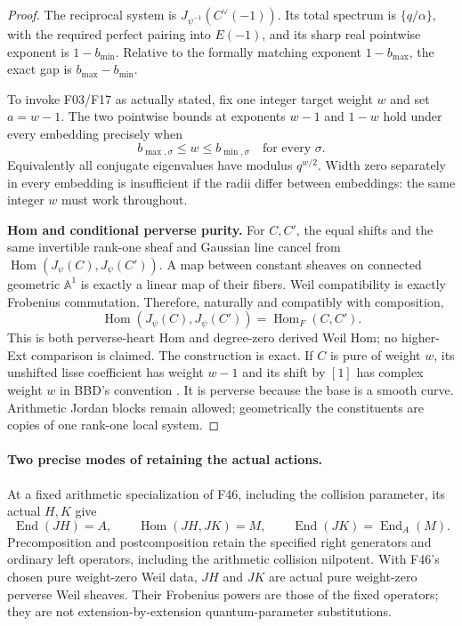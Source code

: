 \documentclass[11pt,a4paper]{article}
\newcommand{\A}{\mathbb A}\newcommand{\PP}{\mathbb P}\newcommand{\GL}{\mathrm{GL}}
\newcommand{\Hom}{\operatorname{Hom}}\newcommand{\Spec}{\operatorname{Spec}}\newcommand{\Tr}{\operatorname{Tr}}\newcommand{\rank}{\operatorname{rank}}\newcommand{\Sym}{\operatorname{Sym}}\newcommand{\Res}{\operatorname{Res}}\newcommand{\IC}{\operatorname{IC}}\newcommand{\Gr}{\operatorname{Gr}}\newcommand{\Rep}{\operatorname{Rep}}\newcommand{\Frob}{\operatorname{Frob}}\newcommand{\End}{\operatorname{End}}
\newcommand{\fid}[1]{\textsf{#1}}\newcommand{\gate}[1]{\textsf{#1}}
\theoremstyle{named}\newtheorem{finding}{Finding}[section]
\theoremstyle{definition}\newtheorem{definition}[finding]{Definition}
\theoremstyle{remark}\newtheorem{remark}[finding]{Remark}
\begin{document}
\begin{proof}
The reciprocal system is
$J_{\psi^{-1}}(C^\vee(-1))$. Its total spectrum is
$\{q/\alpha\}$, with the required perfect pairing into
$E(-1)$, and its sharp real pointwise exponent is
$1-b_{\min}$. Relative to the formally matching exponent
$1-b_{\max}$, the exact gap is $b_{\max}-b_{\min}$.

To invoke \fid{F03}/\fid{F17} as actually stated, fix one
integer target weight $w$ and set $a=w-1$.
The two pointwise bounds at exponents $w-1$ and $1-w$
hold under every embedding precisely when
\begin{equation}\label{eq:gausscommonweight}
 b_{\max,\sigma}\le w\le b_{\min,\sigma}
                    \quad\text{for every }\sigma.
\end{equation}
Equivalently all conjugate eigenvalues have modulus
$q^{w/2}$. Width zero separately in every embedding is
insufficient if the radii differ between embeddings:
the same integer $w$ must work throughout.

\par\smallskip\noindent\textbf{Hom and conditional perverse purity.}\quad
For $C,C'$, the equal shifts and the same invertible
rank-one sheaf and Gaussian line cancel from
$\Hom(J_\psi(C),J_\psi(C'))$. A map between constant
sheaves on connected geometric $\A^1$ is exactly a
linear map of their fibers. Weil compatibility is exactly
Frobenius commutation. Therefore, naturally and
compatibly with composition,
\[
 \Hom(J_\psi(C),J_\psi(C'))=\Hom_F(C,C').
\]
This is both perverse-heart Hom and degree-zero derived
Weil Hom; no higher-Ext comparison is claimed.
The construction is exact. If $C$ is pure of weight $w$,
its unshifted lisse coefficient has weight $w-1$ and its
shift by $[1]$ has complex weight $w$ in BBD's convention
\cite[5.1.8, pp.~126--127]{BBD}.
It is perverse because the base is a smooth curve.
Arithmetic Jordan blocks remain allowed; geometrically
the constituents are copies of one rank-one local system.
\end{proof}

\paragraph{Two precise modes of retaining the actual actions.}
At a fixed arithmetic specialization of \fid{F46}, including
the collision parameter, its actual $H,K$ give
\[
 \End(JH)=A,\qquad \Hom(JH,JK)=M,\qquad
 \End(JK)=\End_A(M).
\]
Precomposition and postcomposition retain the specified
right generators and ordinary left operators, including
the arithmetic collision nilpotent. With \fid{F46}'s
chosen pure weight-zero Weil data, $JH$ and $JK$ are
actual pure weight-zero perverse Weil sheaves.
Their Frobenius powers are those of the fixed operators;
they are not extension-by-extension quantum-parameter
substitutions.
\end{document}
